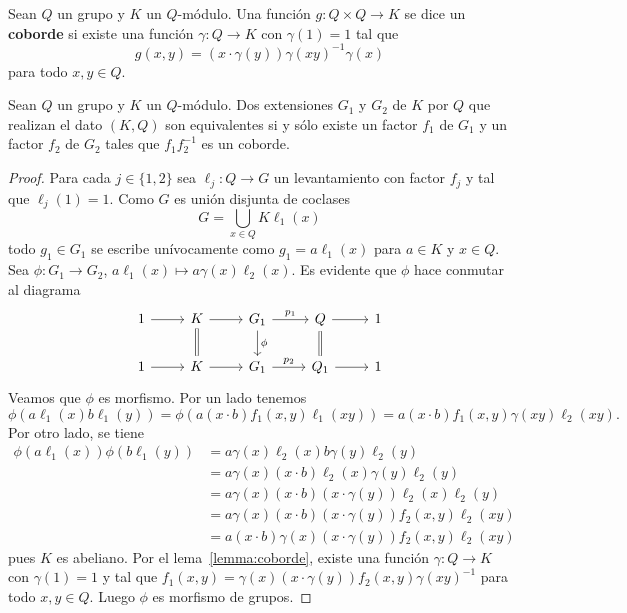 \begin{definition}
	Sean $Q$ un grupo y $K$ un $Q$-módulo. Una función $g\colon Q\times Q\to K$
	se dice un \textbf{coborde} si existe una función $\gamma\colon Q\to K$ con
	$\gamma(1)=1$ tal que
	\[
	g(x,y)=(x\cdot \gamma(y))\gamma(xy)^{-1}\gamma(x)
	\]
	para todo $x,y\in Q$.
\end{definition}

\begin{lemma}
	\label{lemma:equivalencia}
	Sean $Q$ un grupo y $K$ un $Q$-módulo. Dos extensiones $G_1$ y $G_2$ de $K$ por $Q$ 
	que realizan el dato $(K,Q)$ son
	equivalentes si y sólo existe un factor  $f_1$ de $G_1$ y un factor $f_2$
	de $G_2$ tales que $f_1f_2^{-1}$ es un coborde.
\end{lemma}

\begin{proof}
	Para cada $j\in\{1,2\}$ sea $\ell_j\colon Q\to G$ un levantamiento con
	factor $f_j$ y tal que $\ell_j(1)=1$. 
	Como $G$ es unión disjunta de coclases
	\[
	G=\bigcup_{x\in Q}K\ell_1(x)
	\]
	todo $g_1\in G_1$ se escribe unívocamente como $g_1=a\ell_1(x)$ para $a\in
	K$ y $x\in Q$. Sea $\phi\colon G_1\to G_2$, $a\ell_1(x)\mapsto
	a\gamma(x)\ell_2(x)$. Es evidente que $\phi$ hace conmutar al diagrama
	\begin{equation}
		\label{eq:diagrama}
\begin{tikzcd}
	1 & K & {G_1} & Q & 1 \\
	1 & K & {G_1} & {Q_1} & 1
	\arrow[from=1-2, to=1-3]
	\arrow["{p_1}", from=1-3, to=1-4]
	\arrow[from=1-4, to=1-5]
	\arrow[from=1-1, to=1-2]
	\arrow[from=2-1, to=2-2]
	\arrow[from=2-2, to=2-3]
	\arrow["{p_2}", from=2-3, to=2-4]
	\arrow[from=2-4, to=2-5]
	\arrow[equal, no head, from=1-2, to=2-2]
	\arrow["\phi", from=1-3, to=2-3]
	\arrow[equal, from=1-4, to=2-4]
    \end{tikzcd}
	\end{equation}
	Veamos que $\phi$ es morfismo. Por un lado tenemos
	\[
		\phi(a\ell_1(x)b\ell_1(y))=\phi(a(x\cdot b)f_1(x,y)\ell_1(xy))=a(x\cdot b)f_1(x,y)\gamma(xy)\ell_2(xy).
	\]
	Por otro lado, se tiene 
	\begin{align*}
		\phi(a\ell_1(x))\phi(b\ell_1(y))
		&=a\gamma(x)\ell_2(x)b\gamma(y)\ell_2(y)\\
		&=a\gamma(x)(x\cdot b)\ell_2(x)\gamma(y)\ell_2(y)\\
		&=a\gamma(x)(x\cdot b)(x\cdot \gamma(y))\ell_2(x)\ell_2(y)\\
		&=a\gamma(x)(x\cdot b)(x\cdot \gamma(y))f_2(x,y)\ell_2(xy)\\
		&=a(x\cdot b)\gamma(x)(x\cdot \gamma(y))f_2(x,y)\ell_2(xy)
	\end{align*}
	pues $K$ es abeliano.  Por el lema~\ref{lemma:coborde}, existe una función
	$\gamma\colon Q\to K$ con $\gamma(1)=1$ y tal que  
	$f_1(x,y)=\gamma(x)(x\cdot \gamma(y))f_2(x,y)\gamma(xy)^{-1}$ 
	para todo $x,y\in Q$. Luego $\phi$ es morfismo de grupos. 


\end{proof}
